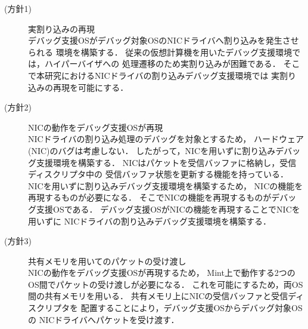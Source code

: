 \documentclass[tanilab-enum]{graduate}
\begin{document}
\begin{description}
    \item[(方針1)]実割り込みの再現\\
        デバッグ支援OSがデバッグ対象OSのNICドライバへ割り込みを発生させられる
        環境を構築する．
        従来の仮想計算機を用いたデバッグ支援環境では，ハイパーバイザへの
        処理遷移のため実割り込みが困難である．
        そこで本研究におけるNICドライバの割り込みデバッグ支援環境では
        実割り込みの再現を可能にする．

    \item[(方針2)]NICの動作をデバッグ支援OSが再現\\
        NICドライバの割り込み処理のデバッグを対象とするため，
        ハードウェア(NIC)のバグは考慮しない．
        したがって，NICを用いずに割り込みデバッグ支援環境を構築する．
        NICはパケットを受信バッファに格納し，受信ディスクリプタ中の
        受信バッファ状態を更新する機能を持っている．
        NICを用いずに割り込みデバッグ支援環境を構築するため，
        NICの機能を再現するものが必要になる．
        そこでNICの機能を再現するものがデバッグ支援OSである．
        デバッグ支援OSがNICの機能を再現することでNICを用いずに
        NICドライバの割り込みデバッグ支援環境を構築する．

    \item[(方針3)]共有メモリを用いてのパケットの受け渡し\\
        NICの動作をデバッグ支援OSが再現するため，
        Mint上で動作する2つのOS間でパケットの受け渡しが必要になる．
        これを可能にするため，両OS間の共有メモリを用いる．
        共有メモリ上にNICの受信バッファと受信ディスクリプタを
        配置することにより，デバッグ支援OSからデバッグ対象OSの
        NICドライバへパケットを受け渡す．

\end{description}
\end{document}
